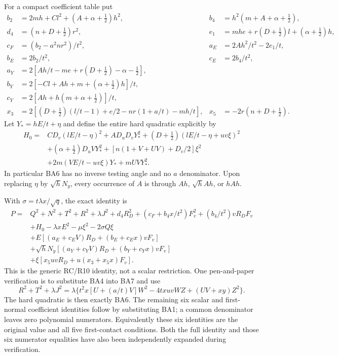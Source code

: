 For a compact coefficient table put
\[
 \begin{aligned}
 b_2&=2mh+Cl^2+(A+\alpha+\tfrac12)h^2,&
 b_4&=h^2(m+A+\alpha+\tfrac12),\\
 d_4&=(n+D+\tfrac12)r^2,&
 e_1&=mhe+r(D+\tfrac12)l+(\alpha+\tfrac12)h,\\
 c_F&=(b_2-a^2nr^2)/t^2,&
 a_E&=2Ah^2/t^2-2e_1/t,\\
 b_E&=2b_2/t^2,&c_E&=2b_4/t^2,\\
 a_Y&=2[Ah/t-me+r(D+\tfrac12)-\alpha-\tfrac12],\\
 b_Y&=2[-Cl+Ah+m+(\alpha+\tfrac12)h]/t,\\
 c_Y&=2[Ah+h(m+\alpha+\tfrac12)]/t,\\
 x_3&=2[(D+\tfrac12)(l/t-1)+e/2-nr(1+a/t)-mh/t],&
 x_5&=-2r(n+D+\tfrac12).
 \end{aligned}                                                     \tag{BA5}
\]
Let $Y_*=hE/t+\eta$ and define the entire hard quadratic explicitly by
\[
 \begin{split}
 H_0={}&CD_v(lE/t-\eta)^2+AD_uD_vY_*^2
 +(D+\tfrac12)(lE/t-\eta+uv\xi)^2\\
 &+(\alpha+\tfrac12)D_uVY_*^2
 +[n(1+V+UV)+D_v/2]\xi^2\\
 &+2m(VE/t-uv\xi)Y_*+mUVY_*^2.
 \end{split}                                                       \tag{BA6}
\]
In particular BA6 has no inverse testing angle and no $a$ denominator.
Upon replacing $\eta$ by $\sqrt hN_y$, every occurrence of $A$
is through $Ah$, $\sqrt hAh$, or $hAh$.

With $\sigma=t\lambda x/\sqrt q$, the exact identity is
\[
 \begin{split}
 P={}&Q^2+N^2+T^2+R^2+\lambda J^2+d_4R_D^2
 +(c_F+b_4x/t^2)F_v^2+(b_4/t^2)vR_DF_v\\
 &+H_0-\lambda xE^2-\mu\xi^2-2\sigma Q\xi\\
 &+E[(a_E+c_EV)R_D+(b_E+c_Ex)vF_v]\\
 &+\sqrt hN_y[(a_Y+c_YV)R_D+(b_Y+c_Yx)vF_v]\\
 &+\xi[x_5uvR_D+u(x_3+x_5x)F_v].
 \end{split}\tag{BA7}
\]
This is the generic RC/R10 identity, not a scalar restriction.
One pen-and-paper verification is to substitute BA4 into BA7 and use
\[
 R^2+T^2+\lambda J^2
 =\lambda\{t^2x[U+(a/t)V]W^2-4txuvWZ+(UV+xy)Z^2\}.
\]
The hard quadratic is then exactly BA6. The remaining six scalar
and first-normal coefficient identities follow by substituting BA1;
a common denominator leaves zero polynomial numerators. Equivalently
these six identities are the original value and all five first-contact
conditions. Both the full identity and those six numerator equalities
have also been independently expanded during verification.

